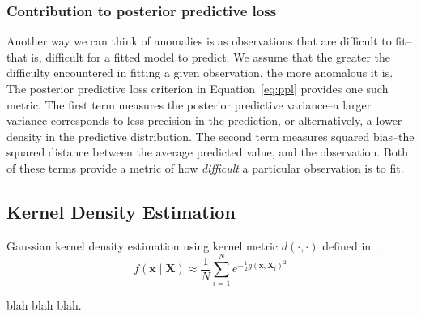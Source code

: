 \subsubsection{Contribution to posterior predictive loss}
Another way we can think of anomalies is as observations that are difficult to fit--that is, difficult
    for a fitted model to predict.  We assume that the greater the difficulty encountered in fitting a
    given observation, the more anomalous it is.  The posterior predictive loss criterion in
    Equation~\ref{eq:ppl} provides one such metric.  The first term measures the posterior predictive
    variance--a larger variance corresponds to less precision in the prediction, or alternatively, a lower
    density in the predictive distribution.  The second term measures squared bias--the squared distance
    between the average predicted value, and the observation.  Both of these terms provide a metric of
    how \emph{difficult} a particular observation is to fit.

\subsection{Kernel Density Estimation}

Gaussian kernel density estimation using kernel metric $d(\cdot,\cdot)$ defined in \cite{trubey:pg}.
\begin{equation}
    f(\bm{x}\mid \bm{X}) \approx \frac{1}{N}\sum_{i = 1}^Ne^{-\frac{1}{2}g(\bm{x},\bm{X}_i)^2}
\end{equation}

blah blah blah.





